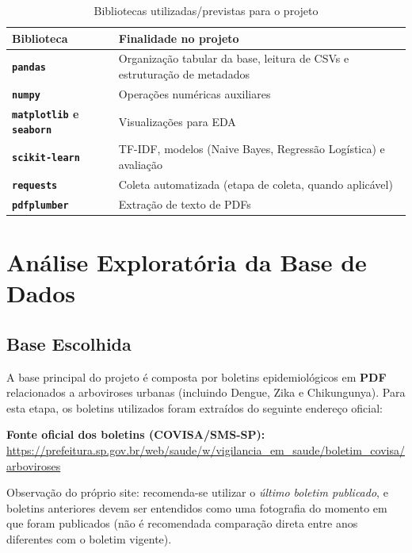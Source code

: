 \documentclass[12pt,a4paper]{article}
\begin{document}
\begin{table}[htbp]
\centering
\renewcommand{\arraystretch}{1.25}
\begin{tabularx}{\textwidth}{>{\bfseries}p{4.4cm} Y}
\toprule
Biblioteca & Finalidade no projeto \\
\midrule
\texttt{pandas} & Organização tabular da base, leitura de CSVs e estruturação de metadados \\
\texttt{numpy} & Operações numéricas auxiliares \\
\texttt{matplotlib} e \texttt{seaborn} & Visualizações para EDA \\
\texttt{scikit-learn} & TF-IDF, modelos (Naive Bayes, Regressão Logística) e avaliação \\
\texttt{requests} & Coleta automatizada (etapa de coleta, quando aplicável) \\
\texttt{pdfplumber} & Extração de texto de PDFs \\
\bottomrule
\end{tabularx}
\caption{Bibliotecas utilizadas/previstas para o projeto}
\label{tab:bibliotecas}
\end{table}

\clearpage
\section{Análise Exploratória da Base de Dados}

\subsection{Base Escolhida}

A base principal do projeto é composta por boletins epidemiológicos em \textbf{PDF} relacionados a arboviroses urbanas (incluindo Dengue, Zika e Chikungunya). Para esta etapa, os boletins utilizados foram extraídos do seguinte endereço oficial:

\vspace{0.2cm}
\noindent
\textbf{Fonte oficial dos boletins (COVISA/SMS-SP):} \\
\url{https://prefeitura.sp.gov.br/web/saude/w/vigilancia_em_saude/boletim_covisa/arboviroses}

\vspace{0.2cm}
\noindent
Observação do próprio site: recomenda-se utilizar o \textit{último boletim publicado}, e boletins anteriores devem ser entendidos como uma fotografia do momento em que foram publicados (não é recomendada comparação direta entre anos diferentes com o boletim vigente).
\end{document}
